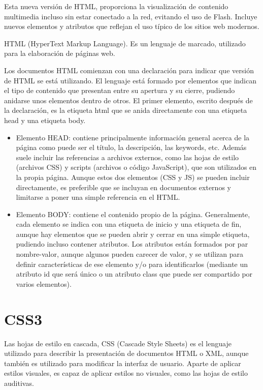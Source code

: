 Esta nueva versión de HTML, proporciona la visualización de contenido multimedia incluso sin estar conectado a la red, evitando el uso de Flash. Incluye nuevos elementos y atributos que reflejan el uso típico de los sitios web modernos. 


HTML (HyperText Markup Language). Es un lenguaje de marcado,  utilizado para la elaboración de páginas web.


Los documentos HTML comienzan con una declaración para indicar que versión de HTML se está utilizando. El lenguaje está formado por elementos que indican el tipo de contenido que presentan entre su apertura y su cierre, pudiendo anidarse unos elementos dentro de otros. El primer elemento, escrito después de la declaración, es la etiqueta html que se anida directamente con una etiqueta head y una etiqueta body.

\begin{itemize}
\item Elemento HEAD: contiene principalmente información general acerca de la página como puede ser el título, la descripción, las keywords, etc. Además suele incluir las referencias a archivos externos, como las hojas de estilo (archivos CSS) y scripts (archivos o código JavaScript), que son utilizados en la propia página. Aunque estos dos elementos (CSS y JS) se pueden incluir directamente, es preferible que se incluyan en documentos externos y limitarse a poner una simple referencia en el HTML.
\item Elemento BODY: contiene el contenido propio de la página.
Generalmente, cada elemento se indica con una etiqueta de inicio y una etiqueta de fin, aunque hay elementos que se pueden abrir y cerrar en una simple etiqueta,  pudiendo incluso contener atributos. Los atributos están formados por par nombre-valor, aunque algunos pueden carecer de valor, y se utilizan para definir características de ese elemento y/o para identificarlos (mediante un atributo id que será único o un atributo class que puede ser compartido por varios elementos).
\end{itemize}


\section{CSS3} 
\label{sec:css3}


Las hojas de estilo en cascada, CSS (Cascade Style Sheets) es el lenguaje utilizado para describir la presentación de documentos HTML o XML, aunque también es utilizado para modificar la interfaz de usuario. Aparte de aplicar estilos visuales, es capaz de aplicar estilos no visuales, como las hojas de estilo auditivas. 


